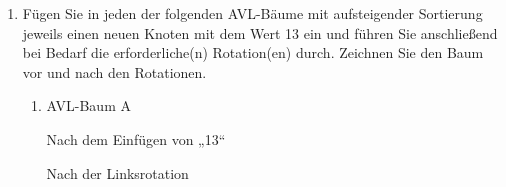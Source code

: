 \documentclass{bschlangaul-aufgabe}
\begin{document}
\begin{enumerate}
\begin{bAntwort}
\begin{bBaum}{Nach dem Ersetzen von „42“ mit „13“}
\end{bBaum}

\begin{bBaum}{Nach dem Vertauschen von „13“ und „28“}
\end{bBaum}
\end{bAntwort}


\item Fügen Sie in jeden der folgenden AVL-Bäume mit aufsteigender
Sortierung jeweils einen neuen Knoten mit dem Wert 13 ein und führen Sie
anschließend bei Bedarf die erforderliche(n) Rotation(en) durch.
Zeichnen Sie den Baum vor und nach den Rotationen.

\begin{enumerate}


\item AVL-Baum A

\begin{bAntwort}

\begin{bBaum}{Nach dem Einfügen von „13“}
\end{bBaum}

\begin{bBaum}{Nach der Linksrotation}
\end{bBaum}


\end{bAntwort}
\end{enumerate}
\end{enumerate}
\end{document}
